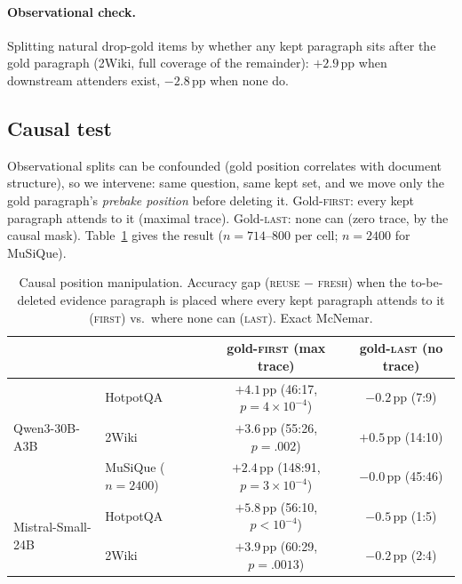 \documentclass[11pt]{article}
\newcommand{\pp}{\,\mathrm{pp}}
\newcommand{\fresh}{\textsc{fresh}}
\newcommand{\reuse}{\textsc{reuse}}
\begin{document}
\paragraph{Observational check.}
Splitting natural drop-gold items by whether any kept paragraph sits after the gold paragraph (2Wiki, full coverage of the remainder): $+2.9\pp$ when downstream attenders exist, $-2.8\pp$ when none do.

\subsection{Causal test}
\label{sec:causal}

Observational splits can be confounded (gold position correlates with document structure), so we intervene: same question, same kept set, and we move only the gold paragraph's \emph{prebake position} before deleting it. Gold-\textsc{first}: every kept paragraph attends to it (maximal trace). Gold-\textsc{last}: none can (zero trace, by the causal mask). Table~\ref{tab:causal} gives the result ($n=714$--$800$ per cell; $n=2400$ for MuSiQue).

\begin{table}[t]
\centering
\caption{Causal position manipulation. Accuracy gap (\reuse{} $-$ \fresh{}) when the to-be-deleted evidence paragraph is placed where every kept paragraph attends to it (\textsc{first}) vs.\ where none can (\textsc{last}). Exact McNemar.}
\label{tab:causal}
\begin{tabular}{llcc}
\toprule
& & gold-\textsc{first} (max trace) & gold-\textsc{last} (no trace) \\
\midrule
\multirow{3}{*}{Qwen3-30B-A3B}
& HotpotQA & $\mathbf{+4.1}\pp$ {\scriptsize(46:17, $p{=}4{\times}10^{-4}$)} & $-0.2\pp$ {\scriptsize(7:9)} \\
& 2Wiki & $\mathbf{+3.6}\pp$ {\scriptsize(55:26, $p{=}.002$)} & $+0.5\pp$ {\scriptsize(14:10)} \\
& MuSiQue {\scriptsize($n{=}2400$)} & $\mathbf{+2.4}\pp$ {\scriptsize(148:91, $p{=}3{\times}10^{-4}$)} & $-0.0\pp$ {\scriptsize(45:46)} \\
\midrule
\multirow{2}{*}{Mistral-Small-24B}
& HotpotQA & $\mathbf{+5.8}\pp$ {\scriptsize(56:10, $p{<}10^{-4}$)} & $-0.5\pp$ {\scriptsize(1:5)} \\
& 2Wiki & $\mathbf{+3.9}\pp$ {\scriptsize(60:29, $p{=}.0013$)} & $-0.2\pp$ {\scriptsize(2:4)} \\
\bottomrule
\end{tabular}
\end{table}
\end{document}
